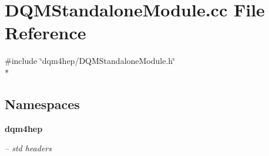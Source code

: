 \section{D\+Q\+M\+Standalone\+Module.\+cc File Reference}
\label{DQMStandaloneModule_8cc}
{\ttfamily \#include \char`\"{}dqm4hep/\+D\+Q\+M\+Standalone\+Module.\+h\char`\"{}}\\*
\subsection*{Namespaces}
\begin{DoxyCompactItemize}
\item 
 {\bf dqm4hep}
\begin{DoxyCompactList}\small\item\em -- std headers \end{DoxyCompactList}\end{DoxyCompactItemize}
